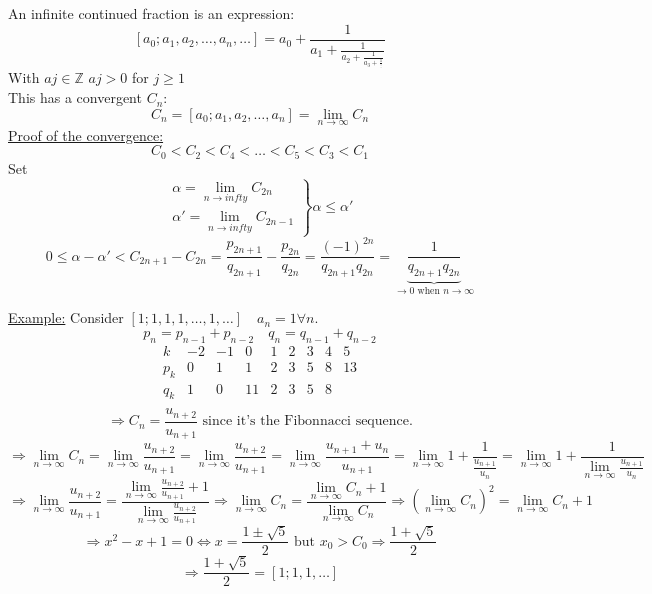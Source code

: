 \documentclass{report}
\begin{document}
\begin{defi}An infinite continued fraction is an expression:
						\[[a_0;a_1,a_2,\dots,a_n,\dots]=a_0+\frac{1}{a_1+\frac{1}{a_2+\frac{1}{a_3+\frac{1}{\vdots}}}}\]
With $aj \in \mathbb{Z}$  $aj>0$ for $j\geq 1$\\
This has a convergent $C_n$: \[C_n=[a_0;a_1,a_2,\dots,a_n]=\lim\limits_{n\to \infty}C_n\]
\underline{Proof of the convergence:} \[C_0<C_2<C_4<\dots<C_5<C_3<C_1\]
																			Set \[\left.
																					\begin{array}{lcl}
																					\alpha = \lim\limits_{n \to infty} C_{2n}\\
																					\alpha'= \lim\limits_{n \to infty} C_{2n-1}
																					\end{array}
																					\right \}
																					\alpha \leq \alpha'\]
																					\[0 \leq \alpha - \alpha' < C_{2n+1}-C_{2n}= \frac{p_{2n+1}}{q_{2n+1}} - \frac{p_{2n}}{q_{2n}}=\frac{(-1)^{2n}}{q_{2n+1}q_{2n}}=\underbrace{\frac{1}{q_{2n+1}q_{2n}}}_{\rightarrow 0 \text{ when } n \to \infty} \]
\end{defi}



\underline{Example:} Consider $[1;1,1,1,\dots,1,\dots] \quad a_n=1 \forall n.$
										 \[p_n=p_{n-1}+p_{n-2}\quad q_n=q_{n-1}+q_{n-2} \]
											\[\begin{array}{l|rrrrrrrr}
												k&-2 &-1 &0 &1 &2 &3 &4 &5\\
												\hline
												p_k&0 &1 &1 &2 &3& 5 &8 &13\\
												q_k&1 &0 &11& 2& 3& 5& 8\\
												\end{array}\]
												\[\Rightarrow C_n=\frac{u_{n+2}}{u_{n+1}} \text{ since it's the Fibonnacci sequence.}\]
												\[\Rightarrow \lim\limits_{n\to \infty}C_n=\lim\limits_{n\to \infty}\frac{u_{n+2}}{u_{n+1}}=\lim\limits_{n\to \infty} \frac{u_{n+2}}{u_{n+1}}=\lim\limits_{n\to \infty} \frac{u_{n+1}+u_n}{u_{n+1}}=\lim\limits_{n\to \infty} 1+\frac{1}{\frac{u_{n+1}}{u_n}}=\lim\limits_{n\to \infty}1+\frac{1}{\lim\limits_{n\to \infty} \frac{u_{n+1}}{u_n}}\]
												\[\Rightarrow \lim\limits_{n\to \infty} \frac{u_{n+2}}{u_{n+1}}=\frac{\lim\limits_{n\to \infty}\frac{u_{n+2}}{u_{n+1}} +1}{\lim\limits_{n\to \infty}\frac{u_{n+2}}{u_{n+1}}}\Rightarrow \lim\limits_{n\to \infty} C_n = \frac{\lim\limits_{n\to \infty} C_n+1}{\lim\limits_{n\to \infty} C_n}
												\Rightarrow (\lim\limits_{n\to \infty} C_n)^2 = \lim\limits_{n\to \infty} C_n +1\]
												\[\Rightarrow x^2-x+1=0 \iff x = \frac{1\pm \sqrt{5}}{2} \text{ but } x_0>C_0 \Rightarrow \frac{1+\sqrt{5}}{2}\]
												\[\Rightarrow\frac{1+\sqrt{5}}{2}=[1;1,1,\dots]\]
												
\end{document}
